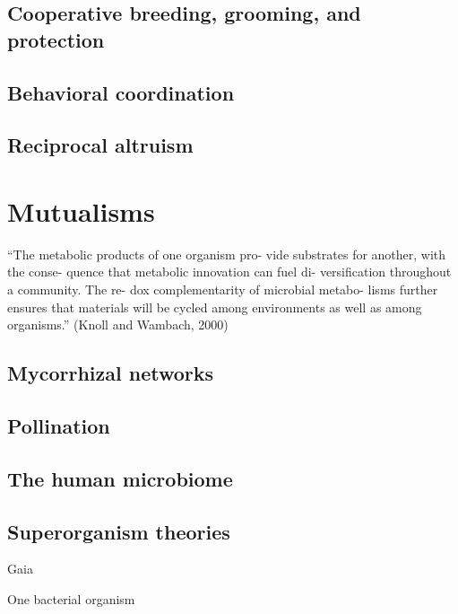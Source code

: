 \documentclass{tufte-book} %
\begin{document}
\section{Cooperative breeding, grooming, and protection}\label{coop-breeding}

\section{Behavioral coordination}\label{coordination}

\section{Reciprocal altruism}\label{reciprocity}



\chapter{Mutualisms}\label{ch:mutualism}

“The metabolic products of one organism pro- vide substrates for another, with the conse- quence that metabolic innovation can fuel di- versification throughout a community. The re- dox complementarity of microbial metabo- lisms further ensures that materials will be cycled among environments as well as among organisms.” (Knoll and Wambach, 2000)


\section{Mycorrhizal networks}

\section{Pollination}

\section{The human microbiome}

\section{Superorganism theories}

Gaia

One bacterial organism
\end{document}
